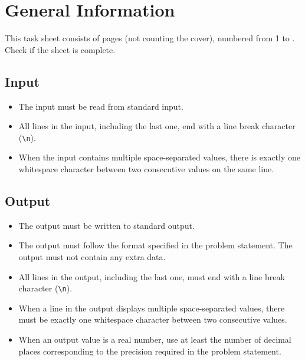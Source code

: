 \section*{General Information}

This task sheet consists of \pageref*{lastpage} pages (not counting the cover), numbered from 1 to \pageref*{lastpage}. Check if the sheet is complete.

\subsection*{Input}

\begin{itemize}
  \item The input must be read from standard input.

	\item All lines in the input, including the last one, end with a line break character (\texttt{\textbackslash n}).

	\item When the input contains multiple space-separated values, there is exactly one whitespace character between two consecutive values on the same line.
\end{itemize}

\subsection*{Output}

\begin{itemize}
	\item The output must be written to standard output.

	\item The output must follow the format specified in the problem statement. The output must not contain any extra data.

	\item All lines in the output, including the last one, must end with a line break character (\texttt{\textbackslash n}).

	\item When a line in the output displays multiple space-separated values, there must be exactly one whitespace character between two consecutive values.

	\item When an output value is a real number, use at least the number of decimal places corresponding to the precision required in the problem statement.
\end{itemize}

